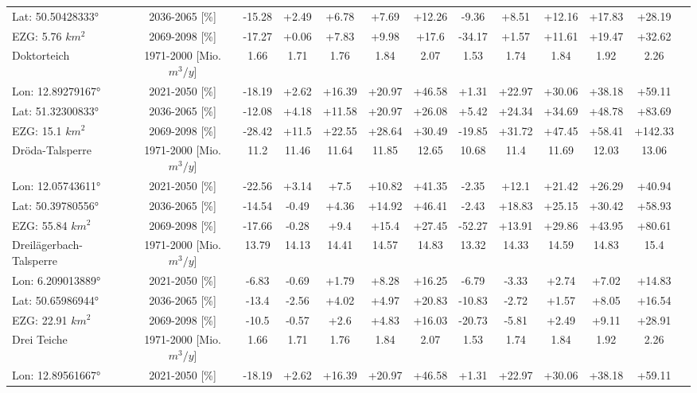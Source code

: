 \begin{longtable}{@{\extracolsep{\fill}}lc|ccccc||cccccc}
Lat: 50.50428333° & 2036-2065 [\%]  & -15.28 & +2.49 & +6.78 & +7.69 & +12.26 & -9.36 & +8.51 & +12.16 & +17.83 & +28.19 & \\ 
EZG: 5.76 $km^2$ & 2069-2098 [\%]  & -17.27 & +0.06 & +7.83 & +9.98 & +17.6 & -34.17 & +1.57 & +11.61 & +19.47 & +32.62 & \\ 
\hline 
Doktorteich & 1971-2000 [Mio. $m^3/y$]  & 1.66 & 1.71 & 1.76 & 1.84 & 2.07 & 1.53 & 1.74 & 1.84 & 1.92 & 2.26 & \\ 
\cline{2-13} 
Lon: 12.89279167° & 2021-2050 [\%]  & -18.19 & +2.62 & +16.39 & +20.97 & +46.58 & +1.31 & +22.97 & +30.06 & +38.18 & +59.11 & \\ 
Lat: 51.32300833° & 2036-2065 [\%]  & -12.08 & +4.18 & +11.58 & +20.97 & +26.08 & +5.42 & +24.34 & +34.69 & +48.78 & +83.69 & \\ 
EZG: 15.1 $km^2$ & 2069-2098 [\%]  & -28.42 & +11.5 & +22.55 & +28.64 & +30.49 & -19.85 & +31.72 & +47.45 & +58.41 & +142.33 & \\ 
\hline 
Dröda-Talsperre & 1971-2000 [Mio. $m^3/y$]  & 11.2 & 11.46 & 11.64 & 11.85 & 12.65 & 10.68 & 11.4 & 11.69 & 12.03 & 13.06 & \\ 
\cline{2-13} 
Lon: 12.05743611° & 2021-2050 [\%]  & -22.56 & +3.14 & +7.5 & +10.82 & +41.35 & -2.35 & +12.1 & +21.42 & +26.29 & +40.94 & \\ 
Lat: 50.39780556° & 2036-2065 [\%]  & -14.54 & -0.49 & +4.36 & +14.92 & +46.41 & -2.43 & +18.83 & +25.15 & +30.42 & +58.93 & \\ 
EZG: 55.84 $km^2$ & 2069-2098 [\%]  & -17.66 & -0.28 & +9.4 & +15.4 & +27.45 & -52.27 & +13.91 & +29.86 & +43.95 & +80.61 & \\ 
\hline 
Dreilägerbach-Talsperre & 1971-2000 [Mio. $m^3/y$]  & 13.79 & 14.13 & 14.41 & 14.57 & 14.83 & 13.32 & 14.33 & 14.59 & 14.83 & 15.4 & \\ 
\cline{2-13} 
Lon: 6.209013889° & 2021-2050 [\%]  & -6.83 & -0.69 & +1.79 & +8.28 & +16.25 & -6.79 & -3.33 & +2.74 & +7.02 & +14.83 & \\ 
Lat: 50.65986944° & 2036-2065 [\%]  & -13.4 & -2.56 & +4.02 & +4.97 & +20.83 & -10.83 & -2.72 & +1.57 & +8.05 & +16.54 & \\ 
EZG: 22.91 $km^2$ & 2069-2098 [\%]  & -10.5 & -0.57 & +2.6 & +4.83 & +16.03 & -20.73 & -5.81 & +2.49 & +9.11 & +28.91 & \\ 
\hline 
Drei Teiche & 1971-2000 [Mio. $m^3/y$]  & 1.66 & 1.71 & 1.76 & 1.84 & 2.07 & 1.53 & 1.74 & 1.84 & 1.92 & 2.26 & \\ 
\cline{2-13} 
Lon: 12.89561667° & 2021-2050 [\%]  & -18.19 & +2.62 & +16.39 & +20.97 & +46.58 & +1.31 & +22.97 & +30.06 & +38.18 & +59.11 & \\ 

\end{longtable}
